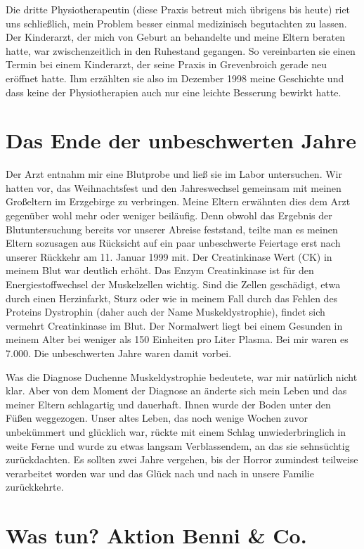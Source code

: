 \documentclass[fontsize=12pt,a4paper,headinclude,DIV=calc,automark]{scrbook}
\begin{document}
Die dritte Physiotherapeutin (diese Praxis betreut mich übrigens bis heute) riet uns schließlich, mein Problem besser einmal medizinisch begutachten zu lassen. Der Kinderarzt, der mich von Geburt an behandelte und meine Eltern beraten hatte, war zwischenzeitlich in den Ruhestand gegangen. So vereinbarten sie einen Termin bei einem Kinderarzt, der seine Praxis in Grevenbroich gerade neu eröffnet hatte. Ihm erzählten sie also im Dezember 1998 meine Geschichte und dass keine der Physiotherapien auch nur eine leichte Besserung bewirkt hatte.

\section{Das Ende der unbeschwerten Jahre}

Der Arzt entnahm mir eine Blutprobe und ließ sie im Labor untersuchen. Wir hatten vor, das Weihnachtsfest und den Jahreswechsel gemeinsam mit meinen Großeltern im Erzgebirge zu verbringen. Meine Eltern erwähnten dies dem Arzt gegenüber wohl mehr oder weniger beiläufig. Denn obwohl das Ergebnis der Blutuntersuchung bereits vor unserer Abreise feststand, teilte man es meinen Eltern sozusagen aus Rücksicht auf ein paar unbeschwerte Feiertage erst nach unserer Rückkehr am 11. Januar 1999 mit. Der Creatinkinase Wert (CK) in meinem Blut war deutlich erhöht. Das Enzym Creatinkinase ist für den Energiestoffwechsel der Muskelzellen wichtig. Sind die Zellen geschädigt, etwa durch einen Herzinfarkt, Sturz oder wie in meinem Fall durch das Fehlen des Proteins Dystrophin (daher auch der Name Muskeldystrophie), findet sich vermehrt Creatinkinase im Blut. Der Normalwert liegt bei einem Gesunden in meinem Alter bei weniger als 150 Einheiten pro Liter Plasma. Bei mir waren es 7.000.
Die unbeschwerten Jahre waren damit vorbei.

Was die Diagnose Duchenne Muskeldystrophie bedeutete, war mir natürlich nicht klar. Aber von dem Moment der Diagnose an änderte sich mein Leben und das meiner Eltern schlagartig und dauerhaft. Ihnen wurde der Boden unter den Füßen weggezogen. Unser altes Leben, das noch wenige Wochen zuvor unbekümmert und glücklich war, rückte mit einem Schlag unwiederbringlich in weite Ferne und wurde zu etwas langsam Verblassendem, an das sie sehnsüchtig zurückdachten. Es sollten zwei Jahre vergehen, bis der Horror zumindest teilweise verarbeitet worden war und das Glück nach und nach in unsere Familie zurückkehrte.

\section{Was tun? Aktion Benni \& Co.}
\end{document}
